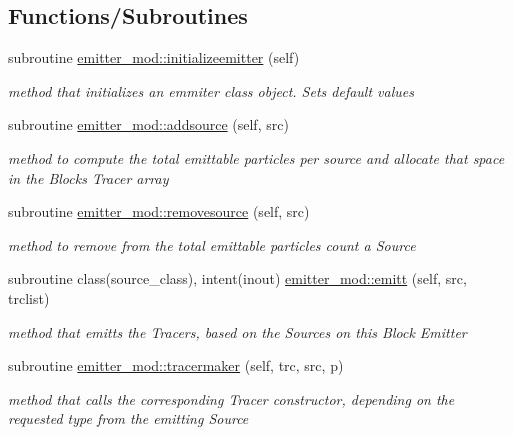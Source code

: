 \subsection*{Functions/\+Subroutines}
\begin{DoxyCompactItemize}
\item 
subroutine \mbox{\hyperlink{namespaceemitter__mod_a6376ad0f8e1739b29caf672aa0750373}{emitter\+\_\+mod\+::initializeemitter}} (self)
\begin{DoxyCompactList}\small\item\em method that initializes an emmiter class object. Sets default values \end{DoxyCompactList}\item 
subroutine \mbox{\hyperlink{namespaceemitter__mod_ab704fb0e2eb9b3b4b9542706b6fb4eaf}{emitter\+\_\+mod\+::addsource}} (self, src)
\begin{DoxyCompactList}\small\item\em method to compute the total emittable particles per source and allocate that space in the Blocks Tracer array \end{DoxyCompactList}\item 
subroutine \mbox{\hyperlink{namespaceemitter__mod_a49b704640270da1c4fad50fcd5374376}{emitter\+\_\+mod\+::removesource}} (self, src)
\begin{DoxyCompactList}\small\item\em method to remove from the total emittable particles count a Source \end{DoxyCompactList}\item 
subroutine class(source\+\_\+class), intent(inout) \mbox{\hyperlink{namespaceemitter__mod_ae620ebb6a0515272d2f3aa12a88e983a}{emitter\+\_\+mod\+::emitt}} (self, src, trclist)
\begin{DoxyCompactList}\small\item\em method that emitts the Tracers, based on the Sources on this Block Emitter \end{DoxyCompactList}\item 
subroutine \mbox{\hyperlink{namespaceemitter__mod_aee7b24637d2249727bccab333e062516}{emitter\+\_\+mod\+::tracermaker}} (self, trc, src, p)
\begin{DoxyCompactList}\small\item\em method that calls the corresponding Tracer constructor, depending on the requested type from the emitting Source \end{DoxyCompactList}\end{DoxyCompactItemize}
